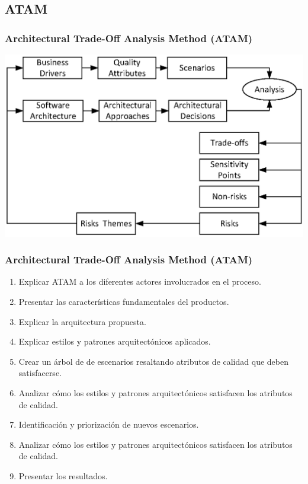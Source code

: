 ﻿\documentclass[handout,a4paper,slidestop,xcolor=pst,blue]{beamer}
\begin{document}
\subsection{ATAM}

\begin{frame}[c]
	\frametitle{Architectural Trade-Off Analysis Method (ATAM)}
	\begin{center}
	  \includegraphics[width=\linewidth]{images/analysis/atam.eps}
	\end{center}


\end{frame}

\begin{frame}[c]
	\frametitle{Architectural Trade-Off Analysis Method (ATAM)}
	\begin{enumerate}
		\item<+-> Explicar ATAM a los diferentes actores involucrados en el proceso.
		\item<+-> Presentar las características fundamentales del productos.
		\item<+-> Explicar la arquitectura propuesta.
		\item<+-> Explicar estilos y patrones arquitectónicos aplicados.
		\item<+-> Crear un árbol de de escenarios resaltando atributos de calidad que deben satisfacerse.
		\item<+-> Analizar cómo los estilos y patrones arquitectónicos satisfacen los atributos de calidad.
		\item<+-> Identificación y priorización de nuevos escenarios.
		\item<+-> Analizar cómo los estilos y patrones arquitectónicos satisfacen los atributos de calidad.
		\item<+-> Presentar los resultados.
	\end{enumerate}
\end{frame}
\end{document}
